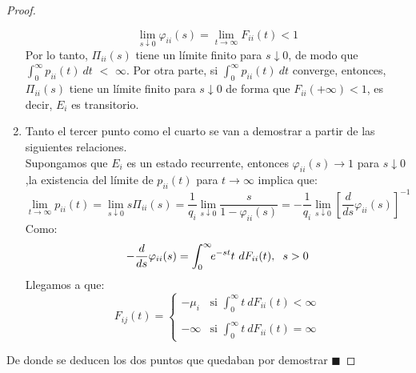 \documentclass[12pt,a4paper]{article}
\newcommand*{\qed}{\hfill\ensuremath{\blacksquare}}
\begin{document}
\begin{proof}
\begin{enumerate}
\begin{equation*}
      \lim\limits_{s\downarrow 0} \varphi_{ii}(s)= \lim\limits_{t\rightarrow \infty} F_{ii}(t)<1
      \end{equation*}
      Por lo tanto, $\Pi_{ii}(s)$ tiene un límite finito para $s$$\downarrow$$0$, de modo que $\int_0^\infty\!\!p_{ii}(t)\ dt $ $<$ $\infty$. Por otra parte, si $\int_0^\infty\!\!p_{ii}(t)\ dt $ converge, entonces, $\Pi_{ii}(s)$ tiene un límite finito para $s$$\downarrow$$0$ de forma que $F_{ii}(+\infty)$$<$$1$, es decir, $E_{i}$ es transitorio.
      \item Tanto el tercer punto como el cuarto se van a demostrar a partir de las siguientes relaciones.
      \\
      Supongamos que $E_{i}$ es un estado recurrente, entonces $\varphi_{ii}(s)$$\rightarrow$$1$ para $s$$\downarrow$$0$,la existencia del límite de $p_{ii}(t)$ para $t$$\rightarrow$$\infty$ implica que:
      \begin{equation*}
      \lim\limits_{t\rightarrow \infty} p_{ii}(t)=\lim\limits_{s\downarrow 0} s\Pi_{ii}(s)=\frac{1}{q_{i}}\lim\limits_{s\downarrow 0} \frac{s}{1-\varphi_{ii}(s)}=-\frac{1}{q_{i}}\lim\limits_{s\downarrow 0} [\frac{d}{ds}\varphi_{ii}(s)]^{-1}
      \end{equation*}
      Como:
      \begin{equation*}
	    - \frac{d}{ds}\varphi_{ii}(s)=\int_{0}^\infty\!\!e^{-st}t\  dF_{ii}(t),  \hspace{0.2cm} s > 0
      \end{equation*}
      Llegamos a que:
          	\begin{equation*}
          	F_{ij}(t) = \left\{
          	\begin{array}{cl}
          -\mu_{i}&\mbox{si } \int_{0}^\infty\!\!t\  dF_{ii}(t)< \infty\\
          \\
          -\infty&\mbox{si } \int_{0}^\infty\!\!t\  dF_{ii}(t)= \infty
          	\end{array}\right.
          	\end{equation*}
          \end{enumerate}
          
         De donde se deducen los dos puntos que quedaban por demostrar 
         \qed
      \end{proof}
\end{document}
